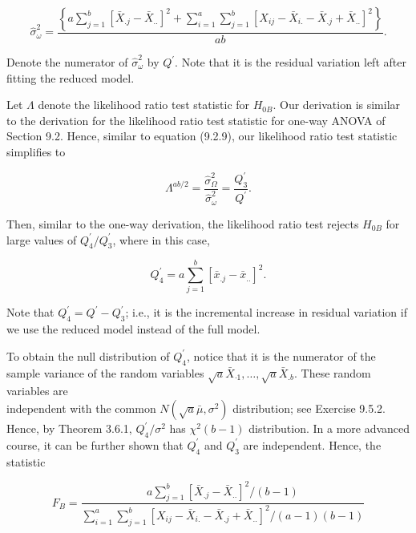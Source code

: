 \begin{equation*}
\hat{\sigma}_{\omega}^{2}=\frac{\left\{a \sum_{j=1}^{b}\left[\bar{X}_{. j}-\bar{X}_{. .}\right]^{2}+\sum_{i=1}^{a} \sum_{j=1}^{b}\left[X_{i j}-\bar{X}_{i .}-\bar{X}_{. j}+\bar{X}_{. .}\right]^{2}\right\}}{a b} . \tag{9.5.10}
\end{equation*}


Denote the numerator of $\hat{\sigma}_{\omega}^{2}$ by $Q^{\prime}$. Note that it is the residual variation left after fitting the reduced model.

Let $\Lambda$ denote the likelihood ratio test statistic for $H_{0 B}$. Our derivation is similar to the derivation for the likelihood ratio test statistic for one-way ANOVA of Section 9.2. Hence, similar to equation (9.2.9), our likelihood ratio test statistic simplifies to

$$
\Lambda^{a b / 2}=\frac{\hat{\sigma}_{\Omega}^{2}}{\hat{\sigma}_{\omega}^{2}}=\frac{Q_{3}^{\prime}}{Q^{\prime}} .
$$

Then, similar to the one-way derivation, the likelihood ratio test rejects $H_{0 B}$ for large values of $Q_{4}^{\prime} / Q_{3}^{\prime}$, where in this case,


\begin{equation*}
Q_{4}^{\prime}=a \sum_{j=1}^{b}\left[\bar{x}_{. j}-\bar{x}_{. .}\right]^{2} . \tag{9.5.11}
\end{equation*}


Note that $Q_{4}^{\prime}=Q^{\prime}-Q_{3}^{\prime}$; i.e., it is the incremental increase in residual variation if we use the reduced model instead of the full model.

To obtain the null distribution of $Q_{4}^{\prime}$, notice that it is the numerator of the sample variance of the random variables $\sqrt{a} \bar{X}_{\cdot 1}, \ldots, \sqrt{a} \bar{X}_{. b}$. These random variables are\\
independent with the common $N\left(\sqrt{a} \bar{\mu}, \sigma^{2}\right)$ distribution; see Exercise 9.5.2. Hence, by Theorem 3.6.1, $Q_{4}^{\prime} / \sigma^{2}$ has $\chi^{2}(b-1)$ distribution. In a more advanced course, it can be further shown that $Q_{4}^{\prime}$ and $Q_{3}^{\prime}$ are independent. Hence, the statistic


\begin{equation*}
F_{B}=\frac{a \sum_{j=1}^{b}\left[\bar{X}_{. j}-\bar{X}_{. .}\right]^{2} /(b-1)}{\sum_{i=1}^{a} \sum_{j=1}^{b}\left[X_{i j}-\bar{X}_{i .}-\bar{X}_{. j}+\bar{X}_{. .}\right]^{2} /(a-1)(b-1)} \tag{9.5.12}
\end{equation*}


